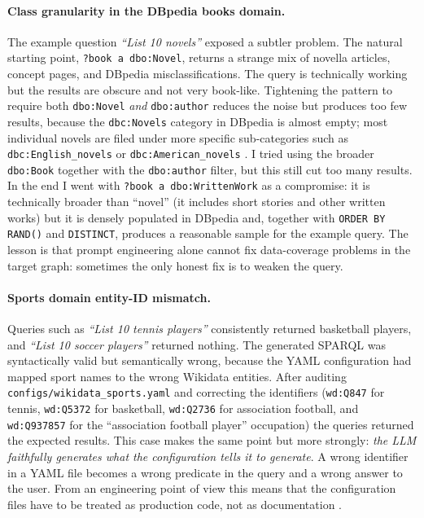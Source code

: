 \documentclass[11pt,a4paper]{article}
\begin{document}
\paragraph{Class granularity in the DBpedia books domain.}
The example question \emph{``List 10 novels''} exposed a subtler
problem. The natural starting point, \texttt{?book\,a\,dbo:Novel},
returns a strange mix of novella articles, concept pages, and
DBpedia misclassifications. The query is technically working but
the results are obscure and not very book-like. Tightening the
pattern to require both \texttt{dbo:Novel} \emph{and}
\texttt{dbo:author} reduces the noise but produces too few results,
because the \texttt{dbc:Novels} category in DBpedia is almost
empty; most individual novels are filed under more specific
sub-categories such as \texttt{dbc:English\_novels} or
\texttt{dbc:American\_novels} \cite{lehmann2015dbpedia}. I tried
using the broader \texttt{dbo:Book} together with the
\texttt{dbo:author} filter, but this still cut too many results.
In the end I went with \texttt{?book\,a\,dbo:WrittenWork} as a
compromise: it is technically broader than ``novel'' (it includes
short stories and other written works) but it is densely populated
in DBpedia and, together with \texttt{ORDER\,BY\,RAND()} and
\texttt{DISTINCT}, produces a reasonable sample for the example
query. The lesson is that prompt engineering alone cannot fix
data-coverage problems in the target graph: sometimes the only
honest fix is to weaken the query.


\paragraph{Sports domain entity-ID mismatch.}
Queries such as \emph{``List 10 tennis players''} consistently
returned basketball players, and \emph{``List 10 soccer players''}
returned nothing. The generated SPARQL was syntactically valid but
semantically wrong, because the YAML configuration had mapped sport
names to the wrong Wikidata entities. After auditing
\texttt{configs/wikidata\_sports.yaml} and correcting the
identifiers (\texttt{wd:Q847} for tennis, \texttt{wd:Q5372} for
basketball, \texttt{wd:Q2736} for association football, and
\texttt{wd:Q937857} for the ``association football player''
occupation) the queries returned the expected results. This case
makes the same point but more
strongly: \emph{the LLM faithfully generates what the configuration
tells it to generate}. A wrong identifier in a YAML file becomes a
wrong predicate in the query and a wrong answer to the user. From
an engineering point of view this means that the configuration
files have to be treated as production code, not as documentation
\cite{liu2023fewshot,brown2020gpt3}.
\end{document}
